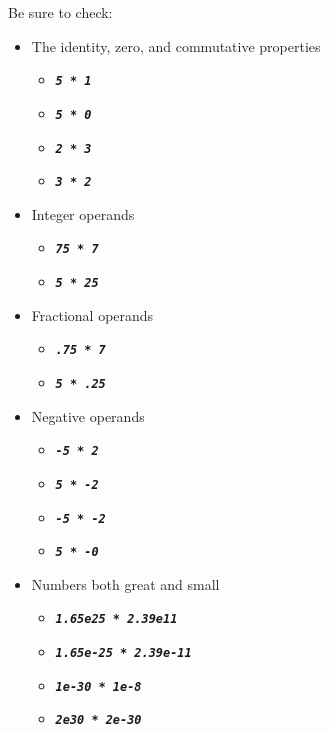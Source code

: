     Be sure to check:
    \begin{itemize}
        \item The identity, zero, and commutative properties
        \begin{itemize}
            \item[] \texttt{\textbf{\textit{5 * 1}}}
            \item[] \texttt{\textbf{\textit{5 * 0}}}
            \item[] \texttt{\textbf{\textit{2 * 3}}}
            \item[] \texttt{\textbf{\textit{3 * 2}}}
        \end{itemize}
        \item Integer operands
        \begin{itemize}
            \item[] \texttt{\textbf{\textit{75 * 7}}}
            \item[] \texttt{\textbf{\textit{5 * 25}}}
        \end{itemize}
        \item Fractional operands
        \begin{itemize}
            \item[] \texttt{\textbf{\textit{.75 * 7}}}
            \item[] \texttt{\textbf{\textit{5 * .25}}}
        \end{itemize}
        \item Negative operands
        \begin{itemize}
            \item[] \texttt{\textbf{\textit{-5 * 2}}}
            \item[] \texttt{\textbf{\textit{5 * -2}}}
            \item[] \texttt{\textbf{\textit{-5 * -2}}}
            \item[] \texttt{\textbf{\textit{5 * -0}}}
        \end{itemize}
        \item Numbers both great and small
        \begin{itemize}
            \item[] \texttt{\textbf{\textit{1.65e25 * 2.39e11}}}
            \item[] \texttt{\textbf{\textit{1.65e-25 * 2.39e-11}}}
            \item[] \texttt{\textbf{\textit{1e-30 * 1e-8}}}
            \item[] \texttt{\textbf{\textit{2e30 * 2e-30}}}
        \end{itemize}

\end{itemize}
